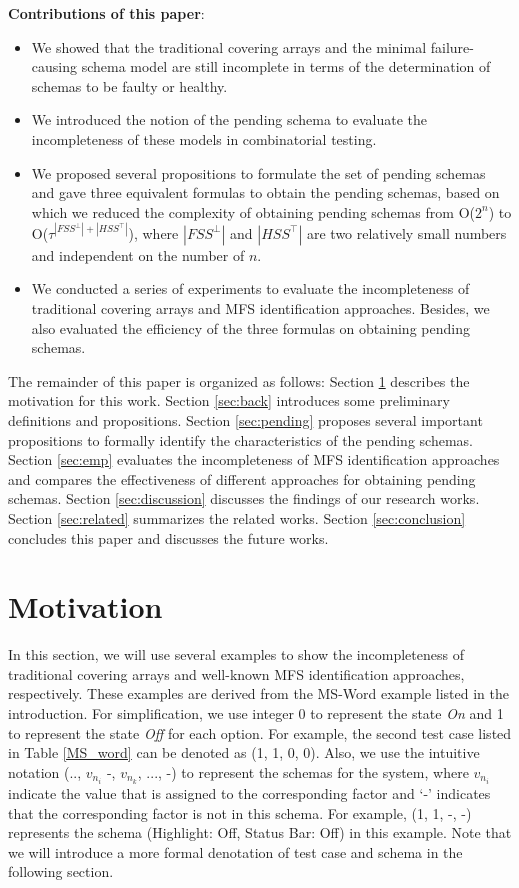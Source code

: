\textbf{Contributions of this paper}:
\begin{itemize}

  \item We showed that the traditional covering arrays and the minimal failure-causing schema model are still incomplete in terms of the determination of schemas to be faulty or healthy.
  \item We introduced the notion of the pending schema to evaluate the incompleteness of these models in combinatorial testing.
  \item We proposed several propositions to formulate the set of pending schemas and gave three equivalent formulas to obtain the pending schemas, based on which we reduced the complexity of obtaining pending schemas from O($2^{n}$) to O($ \tau^{|FSS^{\bot}|+|HSS^{\top}|}$), where $|FSS^{\bot}|$ and $|HSS^{\top}|$ are two relatively small numbers and independent on the number of $n$.
  \item We conducted a series of experiments to evaluate the incompleteness of traditional covering arrays and MFS identification approaches. Besides, we also evaluated the efficiency of the three formulas on obtaining pending schemas.
\end{itemize}

The remainder of this paper is organized as follows: Section \ref{sec:motiv} describes the motivation for this work. Section \ref{sec:back} introduces some preliminary definitions and propositions. Section \ref{sec:pending} proposes several important propositions to formally identify the characteristics of the pending schemas. Section \ref{sec:emp} evaluates the incompleteness of MFS identification approaches and compares the effectiveness of different approaches for obtaining pending schemas. Section \ref{sec:discussion} discusses the findings of our research works.  Section \ref{sec:related} summarizes the related works. Section \ref{sec:conclusion} concludes this paper and discusses the future works.


\section{Motivation}\label{sec:motiv}

In this section, we will use several examples to show the incompleteness of traditional covering arrays and well-known MFS identification approaches, respectively. These examples are derived from the MS-Word example listed in the introduction. For simplification, we use integer 0 to represent the state \emph{On} and 1 to represent the state \emph{Off} for each option. For example, the second test case listed in Table \ref{MS_word} can be denoted as (1, 1, 0, 0). Also, we use the intuitive notation (.., $v_{n_{i}}$ -, $v_{n_{k}}$, ..., -) to represent the schemas for the system, where $v_{n_{i}}$ indicate the value that is assigned to the corresponding factor and `-' indicates that the corresponding factor is not in this schema. For example, (1, 1, -, -) represents the schema (Highlight: Off, Status Bar: Off) in this example. Note that we will introduce a more formal denotation of test case and schema in the following section.


